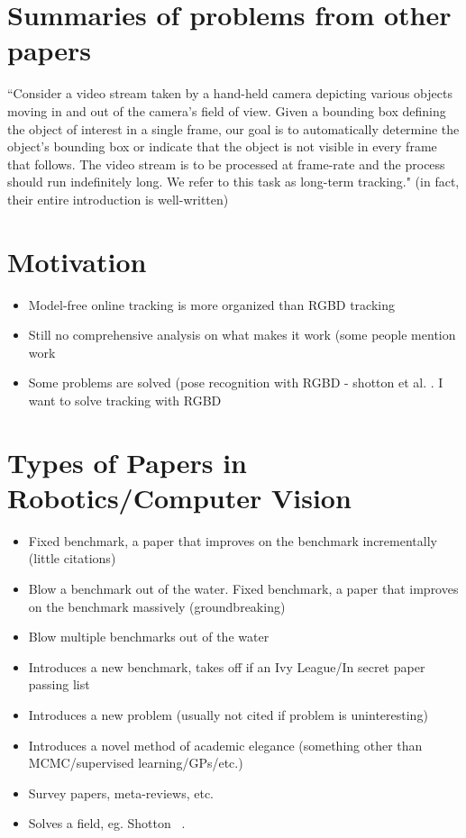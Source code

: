 \section{Summaries of problems from other papers}
``Consider a video stream taken by a hand-held camera depicting various objects moving in and out of the camera’s field of
view. Given a bounding box defining the object of interest
in a single frame, our goal is to automatically determine
the object’s bounding box or indicate that the object is not
visible in every frame that follows. The video stream is to be
processed at frame-rate and the process should run indefinitely
long. We refer to this task as long-term tracking." \cite{kalal2012tracking} (in fact, their entire introduction is well-written)

\section{Motivation}
\begin{itemize}
  \item Model-free online tracking is more organized than RGBD tracking
  \item Still no comprehensive analysis on what makes it work (some people mention work
  \item Some problems are solved (pose recognition with RGBD - shotton et al. \cite{shotton2013real}. I want to solve tracking with RGBD
\end{itemize}


\section{Types of Papers in Robotics/Computer Vision}
\begin{itemize}
  \item Fixed benchmark, a paper that improves on the benchmark incrementally (little citations)
  \item Blow a benchmark out of the water. Fixed benchmark, a paper that improves on the benchmark massively (groundbreaking)
  \item Blow multiple benchmarks out of the water
  \item Introduces a new benchmark, takes off if an Ivy League/In secret paper passing list
  \item Introduces a new problem (usually not cited if problem is uninteresting)
  \item Introduces a novel method of academic elegance (something other than MCMC/supervised learning/GPs/etc.)
  \item Survey papers, meta-reviews, etc.
  \item Solves a field, eg. Shotton \etal~\cite{shotton2013real}. 
\end{itemize}




